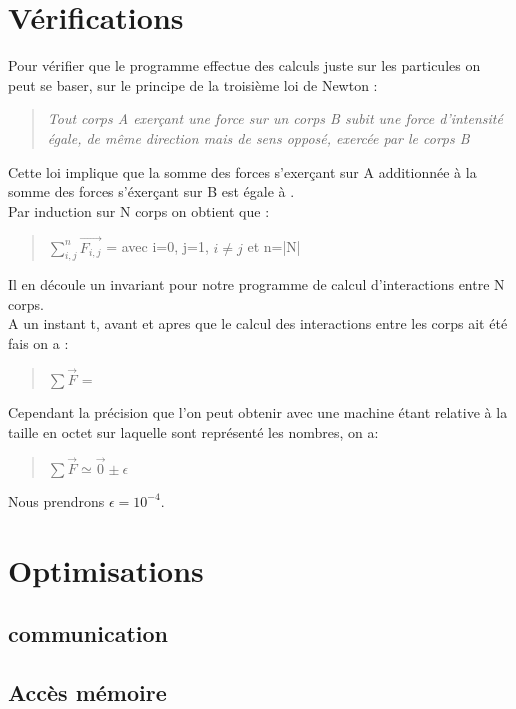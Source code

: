 \section{Vérifications}

\par Pour vérifier que le programme effectue des calculs juste sur les particules on peut se baser, 
sur le principe de la troisième loi de Newton :
\begin{quote}
\textit{Tout corps A exerçant une force sur un corps B subit 
une force d'intensité égale, de même direction mais de sens opposé, exercée par le corps B}
\end{quote}

\par Cette loi implique que la somme des forces s'exerçant sur A additionnée à la somme des forces 
s'éxerçant sur B est égale à  .\\
Par induction sur N corps on obtient que :
\begin{quote}
  \begin{center}
    $\sum_{i,j}^{n} \overrightarrow{F_{i,j}}$ =  avec i=0, j=1, $i\not=j$ et n=|N| 
  \end{center}
\end{quote}

\par Il en découle un invariant pour notre programme de calcul d'interactions entre N corps.\\
A un instant t, avant et apres que le calcul des interactions entre les corps ait été fais 
on a :
\begin{quote}
  \begin{center}
    $\sum \overrightarrow{F}$ = 
  \end{center}
\end{quote}

\par Cependant la précision que l'on peut obtenir avec une machine étant relative à 
la taille en octet sur laquelle sont représenté les nombres, on a:
\begin{quote}
  \begin{center}
    $\sum \overrightarrow{F} \simeq \overrightarrow{0} \pm \epsilon$
  \end{center}
\end{quote}
Nous prendrons $\epsilon = 10^{-4}$.

\section{Optimisations}
\subsection{communication}
\subsection{Accès mémoire}


